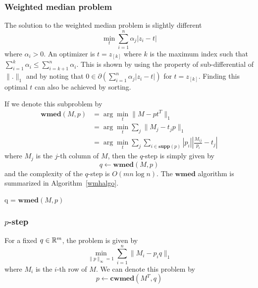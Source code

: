 \subsubsection{Weighted median problem}
The solution to the weighted median problem is slightly different
\[
\min_t \sum_{i = 1}^n \alpha_j |z_i - t|
\]
where $\alpha_i > 0$. An optimizer is $t = z_{[k]}$ where $k$ is the maximum index such that $\sum_{i = 1}^k \alpha_i \leq \sum_{i = k+1}^n \alpha_i$.  This is shown by using the property of sub-differential of $\|.\|_{1}$ and by noting that $0 \in \partial (\sum_{i = 1}^n \alpha_j |z_i - t|)$ for $t = z_{[k]}$. Finding this optimal $t$ can also be achieved by sorting.

If we denote this subproblem by
\begin{align*}
\mathbf{wmed}(M, p) 
&= \arg \min_t \|M - pt^T\|_1 \\
&= \arg \min_t \sum_{j} \|M_j - t_jp\|_1 \\
&= \arg \min_t \sum_{j} \sum_{i \in \mathbf{supp}(p)} |p_i| \left| \frac{M_{ij}}{p_i} - t_j \right|
\end{align*}
where $M_j$ is the $j$-th column of $M$, then the $q$-step is simply given by
\[
q \leftarrow \mathbf{wmed}(M, p) 
\]
and the complexity of the $q$-step is $O(mn\log n)$. The $\mathbf{wmed}$ algorithm is summarized in Algorithm~\ref{wmhalgo}.
%
\begin{algorithm}[h]
\caption{q = $\mathbf{wmed}(M,p)$}
\label{wmhalgo}
\end{algorithm}

\subsubsection{$p$-step} 
For a fixed $q \in {\mathbb R}^m$, the problem is given by
\[
\min_{\|p\|_\infty = 1} \sum_{i = 1}^n \|M_i - p_i q\|_1
\]
where $M_i$ is the $i$-th row of $M$. We can denote this problem by
\[
p \leftarrow \mathbf{cwmed}(M^T, q)
\]

